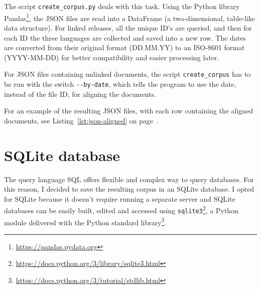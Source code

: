 The script \texttt{create\_corpus.py} deals with this task.
Using the Python library Pandas\footnote{\url{https://pandas.pydata.org}}, the JSON files are read into a DataFrame (a two-dimensional, table-like data structure). 
For linked releases, all the unique ID's are queried, and then for each ID the three languages are collected and saved into a new row. 
The dates are converted from their original format (DD.MM.YY) to an ISO-8601 format (YYYY-MM-DD) \autocite{enwiki:1095673391} for better compatibility and easier processing later.

For JSON files containing unlinked documents, the script \texttt{create\_corpus} has to be run with the switch \texttt{-{}-by-date}, which tells the program to use the date, instead of the file ID, for aligning the documents.

For an example of the resulting \acrshort{JSON} files, with each row containing the aligned documents, see Listing~\ref{lst:json-aligned} on page~\pageref{lst:json-aligned}.




\section{SQLite database}
The query language SQL offers flexible and complex way to query databases. 
For this reason, I decided to save the resulting corpus in an SQLite database. 
I opted for SQLite because it doesn't require running a separate server and SQLite databases can be easily built, edited and accessed using \texttt{sqlite3}\footnote{\url{https://docs.python.org/3/library/sqlite3.html}}, a Python module delivered with the Python standard library\footnote{\url{https://docs.python.org/3/tutorial/stdlib.html}}.

